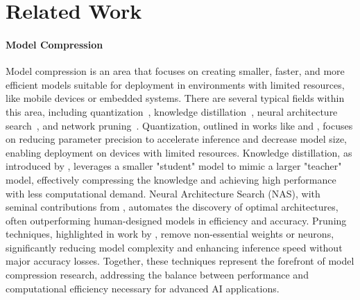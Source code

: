 \section{Related Work}
\paragraph{Model Compression}
Model compression is an area that focuses on creating smaller, faster, and more efficient models suitable for deployment in environments with limited resources, like mobile devices or embedded systems. There are several typical fields within this area, including quantization~\citep{NIPS2015_3e15cc11,rastegari2016xnor,pouransari2020least}, knowledge distillation~\citep{hinton2015distilling, chen2021distilling, zhou2021distilling}, neural architecture search~\citep{liu2018progressive,zoph2016neural,pham2018efficient}, and network pruning~\citep{molchanov2019importance,molchanov2016pruning}. Quantization, outlined in works like \citet{hubara2018quantized} and \citet{jacob2018quantization}, focuses on reducing parameter precision to accelerate inference and decrease model size, enabling deployment on devices with limited resources. Knowledge distillation, as introduced by \citet{hinton2015distilling,romero2014fitnets}, leverages a smaller "student" model to mimic a larger "teacher" model, effectively compressing the knowledge and achieving high performance with less computational demand. Neural Architecture Search (NAS), with seminal contributions from \citet{zoph2016neural}, automates the discovery of optimal architectures, often outperforming human-designed models in efficiency and accuracy. Pruning techniques, highlighted in work by \citet{han2015learning}, remove non-essential weights or neurons, significantly reducing model complexity and enhancing inference speed without major accuracy losses. Together, these techniques represent the forefront of model compression research, addressing the balance between performance and computational efficiency necessary for advanced AI applications.

